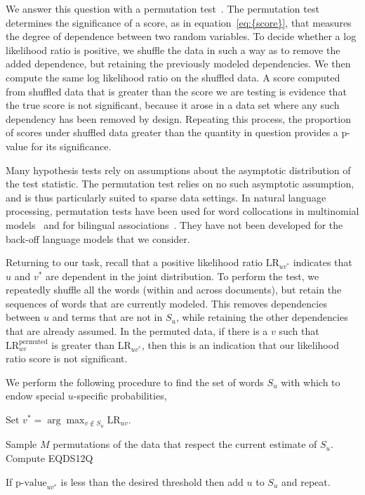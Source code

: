 \documentclass[11pt]{article}
\newenvironment{packed_enumerate}{
  \begin{enumerate}
    \setlength{\topsep}{0pt}
    \setlength{\itemsep}{6pt}
    \setlength{\parskip}{0pt}
    \setlength{\parsep}{0pt}
}\end{enumerate}
\begin{document}
We answer this question with a permutation
test~\citep{Pitman:1937,Good:2000}.  The permutation test determines
the significance of a score, as in {equation~\eqref{eq:{score}}}, that measures the
degree of dependence between two random variables.  To decide whether
a log likelihood ratio is positive, we shuffle the data in such a way
as to remove the added dependence, but retaining the previously
modeled dependencies.  We then compute the same log likelihood ratio
on the shuffled data.  A score computed from shuffled data that is
greater than the score we are testing is evidence that the true score
is not significant, because it arose in a data set where any such
dependency has been removed by design.  Repeating this process, the
proportion of scores under shuffled data greater than the quantity in
question provides a p-value for its significance.

Many hypothesis tests rely on assumptions about the asymptotic
distribution of the test statistic.  The permutation test relies on no
such asymptotic assumption, and is thus particularly suited to sparse
data settings.  In natural language processing, permutation tests have
been used for word collocations in multinomial
models~\citep{Pedersen:1996} and for bilingual
associations~\citep{Moore:2004}.  They have not been developed for the
back-off language models that we consider.

Returning to our task, recall that a positive likelihood ratio
${\textrm{LR}}_{uv^*}$ indicates that $u$ and $v^*$ are dependent in the joint
distribution.  To perform the test, we repeatedly shuffle all the
words (within and across documents), but retain the sequences of words
that are currently modeled.  This removes dependencies between $u$ and
terms that are not in $S_u$, while retaining the other dependencies
that are already assumed.  In the permuted data, if there is a $v$
such that ${\textrm{LR}}^{\textrm{permuted}}_{uv}$ is greater than ${\textrm{LR}}_{uv^*}$,
then this is an indication that our likelihood ratio score is not
significant.

We perform the following procedure to find the set of words $S_u$ with
which to endow special $u$-specific probabilities,
\begin{packed_enumerate}
\item Set $v^* = \arg \max_{v \notin S_u} {\textrm{LR}}_{uv}$.
\item Sample $M$ permutations of the data that respect the current
  estimate of $S_u$.  Compute
  EQDS12Q
\item If $\textrm{p-value}_{uv^{*}}$ is less than the desired
  threshold then add $u$ to $S_u$ and repeat.
\end{packed_enumerate}
\end{document}
